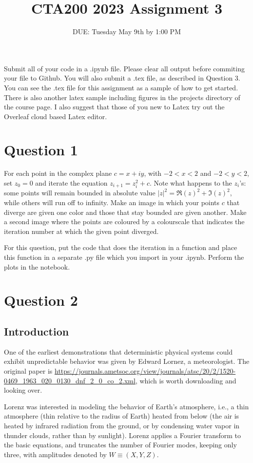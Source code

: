 \documentclass{article}
\title{CTA200 2023 Assignment 3}
\author{DUE: Tuesday May 9th by 1:00 PM}
\date{}
\begin{document}
\maketitle

Submit all of your code in a .ipynb file. Please clear all output before commiting your file to Github. You will also submit a .tex file, as described in Question 3. You can see the .tex file for this assignment as a sample of how to get started. There is also another latex sample including figures in the projects directory of the course page. I also suggest that those of you new to Latex try out the Overleaf cloud based Latex editor.

\section*{Question 1}

For each point in the complex plane $c = x + iy$, with $-2 < x < 2$ and $-2 < y < 2$, set $z_0 = 0$ and iterate the equation $z_{i + 1} = z_i^2 + c$. 
Note what happens to the $z_i$'s: some points will remain bounded in absolute value $|z|^2 = \Re(z)^2 + \Im(z)^2$, while others will run off to infinity. 
Make an image  in which your points $c$ that diverge are given one color and those that stay bounded are given another.
Make a second image where the points are coloured by a colourscale that indicates the iteration number at which the given point diverged.

For this question, put the code that does the iteration in a function and place this function in a separate .py file which you import in your .ipynb.
Perform the plots in the notebook.

\section*{Question 2}

\subsection*{Introduction}
One of the earliest demonstrations that deterministic physical systems could exhibit unpredictable behavior was given by Edward Lornez, a meteorologist. The original paper is \url{https://journals.ametsoc.org/view/journals/atsc/20/2/1520-0469_1963_020_0130_dnf_2_0_co_2.xml}, which is worth downloading and looking over.

Lorenz was interested in modeling the behavior of Earth's atmosphere, i.e., a thin atmosphere (thin relative to the radius of Earth) heated from below (the air is heated by infrared radiation from the ground, or by condensing water vapor in thunder clouds, rather than by sunlight). Lorenz applies a Fourier transform to the basic equations, and truncates the number of Fourier modes, keeping only three, with amplitudes denoted by $W\equiv(X, Y, Z)$.
\end{document}
